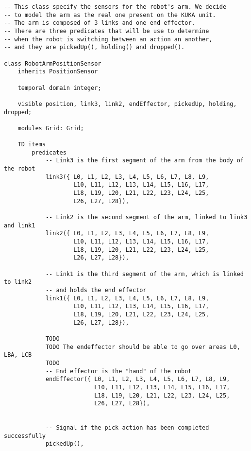 \begin{lstlisting}[fontadjust, mathescape, frame=single] 
-- This class specify the sensors for the robot's arm. We decide
-- to model the arm as the real one present on the KUKA unit.
-- The arm is composed of 3 links and one end effector.
-- There are three predicates that will be use to determine
-- when the robot is switching between an action an another,
-- and they are pickedUp(), holding() and dropped().

class RobotArmPositionSensor
    inherits PositionSensor

    temporal domain integer;

    visible position, link3, link2, endEffector, pickedUp, holding, dropped;

    modules Grid: Grid;

    TD items
        predicates
            -- Link3 is the first segment of the arm from the body of the robot
            link3({ L0, L1, L2, L3, L4, L5, L6, L7, L8, L9,
                    L10, L11, L12, L13, L14, L15, L16, L17,
                    L18, L19, L20, L21, L22, L23, L24, L25,
                    L26, L27, L28}),
                    
            -- Link2 is the second segment of the arm, linked to link3 and link1
            link2({ L0, L1, L2, L3, L4, L5, L6, L7, L8, L9,
                    L10, L11, L12, L13, L14, L15, L16, L17,
                    L18, L19, L20, L21, L22, L23, L24, L25,
                    L26, L27, L28}),
                    
            -- Link1 is the third segment of the arm, which is linked to link2 
            -- and holds the end effector
            link1({ L0, L1, L2, L3, L4, L5, L6, L7, L8, L9,
                    L10, L11, L12, L13, L14, L15, L16, L17,
                    L18, L19, L20, L21, L22, L23, L24, L25,
                    L26, L27, L28}),
                    
            TODO
            TODO The endeffector should be able to go over areas L0, LBA, LCB
            TODO         
            -- End effector is the "hand" of the robot
            endEffector({ L0, L1, L2, L3, L4, L5, L6, L7, L8, L9,
                          L10, L11, L12, L13, L14, L15, L16, L17,
                          L18, L19, L20, L21, L22, L23, L24, L25,
                          L26, L27, L28}),
                    

            -- Signal if the pick action has been completed successfully
            pickedUp(),


\end{lstlisting}
